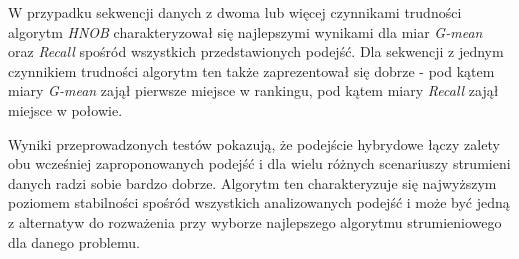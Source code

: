 W przypadku sekwencji danych z dwoma lub więcej czynnikami trudności algorytm \textit{HNOB} charakteryzował się najlepszymi wynikami dla miar \textit{G-mean} oraz \textit{Recall} spośród wszystkich przedstawionych podejść. Dla sekwencji z jednym czynnikiem trudności algorytm ten także zaprezentował się dobrze - pod kątem miary \textit{G-mean} zajął pierwsze miejsce w rankingu, pod kątem miary \textit{Recall} zajął miejsce w połowie.

Wyniki przeprowadzonych testów pokazują, że podejście hybrydowe łączy zalety obu wcześniej zaproponowanych podejść i dla wielu różnych scenariuszy strumieni danych radzi sobie bardzo dobrze. Algorytm ten charakteryzuje się najwyższym poziomem stabilności spośród wszystkich analizowanych podejść i może być jedną z alternatyw do rozważenia przy wyborze najlepszego algorytmu strumieniowego dla danego problemu.

\newpage\null\thispagestyle{empty}\newpage